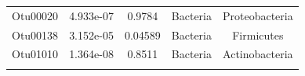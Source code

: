 \documentclass[]{article}
\begin{document}
\begin{longtable}[]{@{}ccccc@{}}
\midrule
\endhead
\begin{minipage}[t]{0.13\columnwidth}\centering\strut
Otu00020\strut
\end{minipage} & \begin{minipage}[t]{0.14\columnwidth}\centering\strut
4.933e-07\strut
\end{minipage} & \begin{minipage}[t]{0.12\columnwidth}\centering\strut
0.9784\strut
\end{minipage} & \begin{minipage}[t]{0.13\columnwidth}\centering\strut
Bacteria\strut
\end{minipage} & \begin{minipage}[t]{0.19\columnwidth}\centering\strut
Proteobacteria\strut
\end{minipage}\tabularnewline
\begin{minipage}[t]{0.13\columnwidth}\centering\strut
Otu00138\strut
\end{minipage} & \begin{minipage}[t]{0.14\columnwidth}\centering\strut
3.152e-05\strut
\end{minipage} & \begin{minipage}[t]{0.12\columnwidth}\centering\strut
0.04589\strut
\end{minipage} & \begin{minipage}[t]{0.13\columnwidth}\centering\strut
Bacteria\strut
\end{minipage} & \begin{minipage}[t]{0.19\columnwidth}\centering\strut
Firmicutes\strut
\end{minipage}\tabularnewline
\begin{minipage}[t]{0.13\columnwidth}\centering\strut
Otu01010\strut
\end{minipage} & \begin{minipage}[t]{0.14\columnwidth}\centering\strut
1.364e-08\strut
\end{minipage} & \begin{minipage}[t]{0.12\columnwidth}\centering\strut
0.8511\strut
\end{minipage} & \begin{minipage}[t]{0.13\columnwidth}\centering\strut
Bacteria\strut
\end{minipage} & \begin{minipage}[t]{0.19\columnwidth}\centering\strut
Actinobacteria\strut
\end{minipage}\tabularnewline
\begin{minipage}[t]{0.13\columnwidth}\centering\strut

\end{minipage}
\end{longtable}
\end{document}
